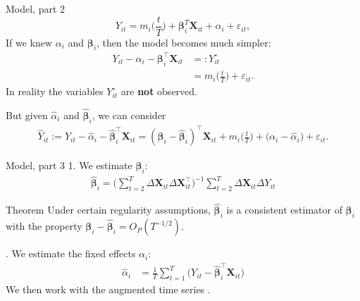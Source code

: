 \documentclass[10pt]{beamer}
\newcommand{\X}{\boldsymbol{X}}
\newcommand{\bfbeta}{\boldsymbol{\beta}}
\begin{document}
\begin{frame}{Model, part 2}
\begin{equation*}
Y_{it} = m_i \Big( \frac{t}{T} \Big) + \bfbeta_i^T\X_{it}+ \alpha_i + \varepsilon_{it},
\end{equation*}\pause
If we knew $\alpha_i$ and $\bfbeta_i$, then the model becomes much simpler:
\begin{align*}
Y_{it} - \alpha_i - \bfbeta_i^\top \X_{it} & =: Y_{it}^\circ\\
					& = m_i \Big( \frac{t}{T} \Big) + \varepsilon_{it}. 
\end{align*}\pause
In reality the variables $Y_{it}^\circ$ are \textbf{not} observed. \pause

But given $\widehat{\alpha}_i$ and $\widehat{\bfbeta}_i$, we can consider
\begin{align*}
	\widehat{Y}_{it} := Y_{it} -\widehat{\alpha}_i - \widehat{\bfbeta}_i^\top \X_{it} =(\bfbeta_i - \widehat{\bfbeta}_i)^\top \X_{it} + m_i \Big( \frac{t}{T} \Big) + \big( \alpha_i - \widehat{\alpha}_i \big) + \varepsilon_{it}. 
\end{align*}
\end{frame}


\begin{frame}{Model, part 3}
1. We estimate $\bfbeta_i$:
\begin{align*}
\widehat{\bfbeta}_i = \Big( \sum_{t=2}^T \Delta \X_{it} \Delta \X_{it}^\top \Big)^{-1} \sum_{t=2}^T \Delta \X_{it} \Delta Y_{it}
\end{align*}\pause
\vspace{-3mm}
\begin{block}{Theorem}
Under certain regularity assumptions, $\widehat{\bfbeta}_i$ is a consistent estimator of $\bfbeta_i$ with the property $\bfbeta_i - \widehat{\bfbeta}_i = O_P(T^{-1/2})$.
\end{block}. We estimate the fixed effects $\alpha_i$:
\begin{align*}
\widehat{\alpha}_i &= \frac{1}{T}\sum_{t=1}^T \big(Y_{it} - \widehat{\bfbeta}_i^\top \X_{it}\big)
\end{align*}\pause
We then work with the augmented time series \color{mLightBrown}{$\widehat{Y}_{it} = Y_{it} - \widehat{\alpha}_i - \widehat{\bfbeta}_i^\top \X_{it}$}.
\end{frame}
\end{document}
